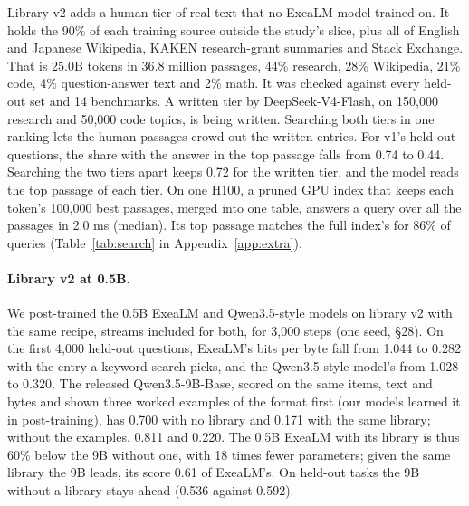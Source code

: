 \documentclass[10pt,twocolumn,letterpaper]{article}
\newcommand{\sect}[1]{\S#1}
\begin{document}
Library v2 adds a human tier of real text that no ExeaLM model trained on.
It holds the 90\% of each training source outside the study's slice, plus all of English and Japanese Wikipedia, KAKEN research-grant summaries and Stack Exchange.
That is 25.0B tokens in 36.8 million passages, 44\% research, 28\% Wikipedia, 21\% code, 4\% question-answer text and 2\% math.
It was checked against every held-out set and 14 benchmarks.
A written tier by DeepSeek-V4-Flash, on 150,000 research and 50,000 code topics, is being written.
Searching both tiers in one ranking lets the human passages crowd out the written entries.
For v1's held-out questions, the share with the answer in the top passage falls from 0.74 to 0.44.
Searching the two tiers apart keeps 0.72 for the written tier, and the model reads the top passage of each tier.
On one H100, a pruned GPU index that keeps each token's 100,000 best passages, merged into one table, answers a query over all the passages in 2.0 ms (median).
Its top passage matches the full index's for 86\% of queries (Table~\ref{tab:search} in Appendix~\ref{app:extra}).

\paragraph{Library v2 at 0.5B.}
We post-trained the 0.5B ExeaLM and Qwen3.5-style models on library v2 with the same recipe, streams included for both, for 3,000 steps (one seed, \sect{28}).
On the first 4,000 held-out questions, ExeaLM's bits per byte fall from 1.044 to 0.282 with the entry a keyword search picks, and the Qwen3.5-style model's from 1.028 to 0.320.
The released Qwen3.5-9B-Base, scored on the same items, text and bytes and shown three worked examples of the format first (our models learned it in post-training), has 0.700 with no library and 0.171 with the same library; without the examples, 0.811 and 0.220.
The 0.5B ExeaLM with its library is thus 60\% below the 9B without one, with 18 times fewer parameters; given the same library the 9B leads, its score 0.61 of ExeaLM's.
On held-out tasks the 9B without a library stays ahead (0.536 against 0.592).
\end{document}
